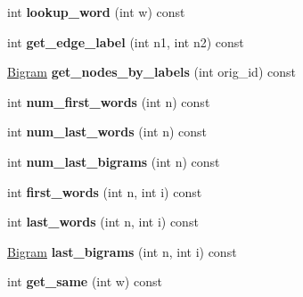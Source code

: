 \begin{DoxyCompactItemize}
\item 
\hypertarget{classForestLattice_a3921d0378a94ef040246dc87e60df1c7}{
int {\bfseries lookup\_\-word} (int w) const }
\label{classForestLattice_a3921d0378a94ef040246dc87e60df1c7}

\item 
\hypertarget{classForestLattice_a92e37fd15cd36ae5c9d0e3fe309d876e}{
int {\bfseries get\_\-edge\_\-label} (int n1, int n2) const }
\label{classForestLattice_a92e37fd15cd36ae5c9d0e3fe309d876e}

\item 
\hypertarget{classForestLattice_a2474198bedc98ef2e3c8a02ebae14f00}{
\hyperlink{structBigram}{Bigram} {\bfseries get\_\-nodes\_\-by\_\-labels} (int orig\_\-id) const }
\label{classForestLattice_a2474198bedc98ef2e3c8a02ebae14f00}

\item 
\hypertarget{classForestLattice_a6fe3508e7fd7d62b44c423dcc113881b}{
int {\bfseries num\_\-first\_\-words} (int n) const }
\label{classForestLattice_a6fe3508e7fd7d62b44c423dcc113881b}

\item 
\hypertarget{classForestLattice_ae6c29306adee71cca87bb2dc2c1047df}{
int {\bfseries num\_\-last\_\-words} (int n) const }
\label{classForestLattice_ae6c29306adee71cca87bb2dc2c1047df}

\item 
\hypertarget{classForestLattice_a7fcb5b75caf3d4e17b782849fc847ec9}{
int {\bfseries num\_\-last\_\-bigrams} (int n) const }
\label{classForestLattice_a7fcb5b75caf3d4e17b782849fc847ec9}

\item 
\hypertarget{classForestLattice_a3b8e0f2d304ad0d9b10d9efb79d7905c}{
int {\bfseries first\_\-words} (int n, int i) const }
\label{classForestLattice_a3b8e0f2d304ad0d9b10d9efb79d7905c}

\item 
\hypertarget{classForestLattice_a9af5d9ea84e0638599d13c5f78868d92}{
int {\bfseries last\_\-words} (int n, int i) const }
\label{classForestLattice_a9af5d9ea84e0638599d13c5f78868d92}

\item 
\hypertarget{classForestLattice_a3332ad66005be68e6ac38d7daa40bb9d}{
\hyperlink{structBigram}{Bigram} {\bfseries last\_\-bigrams} (int n, int i) const }
\label{classForestLattice_a3332ad66005be68e6ac38d7daa40bb9d}

\item 
\hypertarget{classForestLattice_a4da765944fa6d5892786ca592ef8c859}{
int {\bfseries get\_\-same} (int w) const }
\label{classForestLattice_a4da765944fa6d5892786ca592ef8c859}


\end{DoxyCompactItemize}
